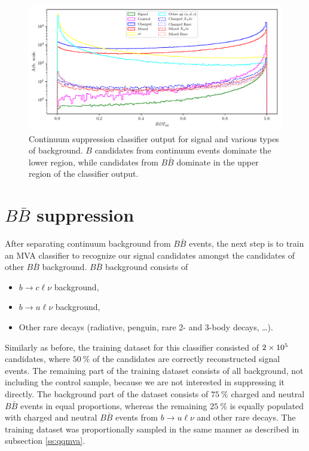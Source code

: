 \begin{figure}[H]
\centering
\captionsetup{width=0.8\linewidth}
\includegraphics[width=\linewidth]{fig/cs_BDT}
\caption{Continuum suppression classifier output for signal and various types of background. $B$ candidates from continuum events dominate the lower region, while candidates from $B\bar B$ dominate in the upper region of the classifier output.}
\label{fig:cs_mva}
\end{figure}

\section{$B\bar B$ suppression}

After separating continuum background from $B \bar B$ events, the next step is to train an MVA classifier to recognize our signal candidates amongst the candidates of other $B \bar B$ background. $B \bar B$ background consists of
\begin{itemize}
\item $b \to c \ell \nu$ background,
\item $b \to u \ell \nu$ background,
\item Other rare decays (radiative, penguin, rare 2- and 3-body decays, \dots).
\end{itemize}

Similarly as before, the training dataset for this classifier consisted of $2\times 10^{5}$ candidates, where $50~\%$ of the candidates are correctly reconstructed signal events. The remaining part of the training dataset consists of all background, not including the control sample, because we are not interested in suppressing it directly. The background part of the dataset consists of $75~\%$ charged and neutral $B \bar B$ events in equal proportions, whereas the remaining $25~\%$ is equally populated with charged and neutral $B \bar B$ events from $b \to u \ell \nu$ and other rare decays. The training dataset was proportionally sampled in the same manner as described in subsection \ref{ss:qqmva}.

